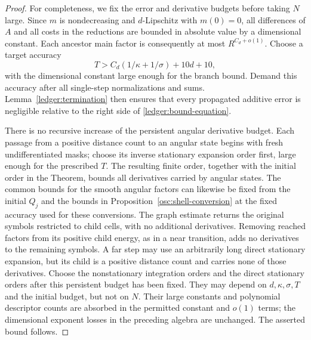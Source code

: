 \begin{proof}
For completeness, we fix the error and derivative budgets before
taking \(N\) large.  Since \(m\) is nondecreasing and
\(d\)-Lipschitz with \(m(0)=0\), all differences of \(A\) and
all costs in the reductions are bounded in absolute value by a
dimensional constant.  Each ancestor main factor is consequently
at most \(R^{C_d+o(1)}\).  Choose a target accuracy
\[
 T>C_d(1/\kappa+1/\sigma)+10d+10,
\]
with the dimensional constant large enough for the branch bound.
Demand this accuracy after all single-step normalizations and
sums.  Lemma~\ref{ledger:termination} then ensures that every
propagated additive error is negligible relative to the right
side of \eqref{ledger:bound-equation}.

There is no recursive increase of the persistent angular
derivative budget.  Each passage from a positive distance count
to an angular state begins with fresh undifferentiated masks;
choose its inverse stationary expansion order first, large
enough for the prescribed \(T\).  The resulting finite order,
together with the initial order in the Theorem, bounds all
derivatives carried by angular states.  The common bounds for the smooth
angular factors can likewise be fixed from the initial \(Q_j\) and the
bounds in Proposition~\ref{osc:shell-conversion} at the fixed accuracy
used for these conversions.
The graph estimate returns the original symbols restricted to child cells,
with no additional derivatives.  Removing reached
factors from its positive child energy, as in a near transition, adds
no derivatives to the remaining symbols.  A far step may use
an arbitrarily long direct stationary expansion, but its child
is a positive distance count and carries none of those
derivatives.  Choose the nonstationary integration orders and
the direct stationary orders after this persistent budget has
been fixed.  They may depend on \(d,\kappa,\sigma,T\) and the
initial budget, but not on \(N\).  Their large constants and
polynomial descriptor counts are absorbed in the permitted
constant and \(o(1)\) terms; the dimensional exponent losses in
the preceding algebra are unchanged.  The asserted bound
follows.
\end{proof}
